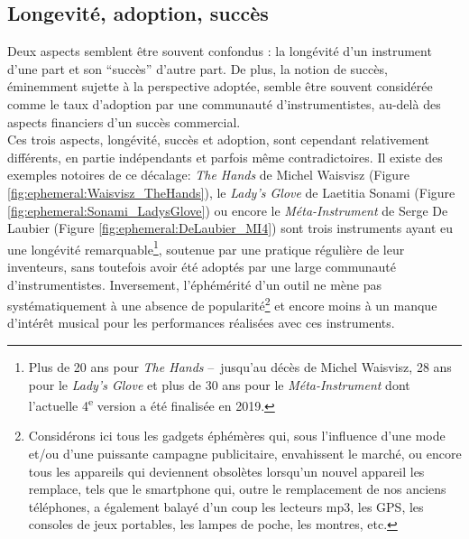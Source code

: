 	
\subsection{Longevité, adoption, succès}

\noindent Deux aspects semblent être souvent confondus : la longévité d'un instrument d'une part et son ``succès'' d'autre part. De plus, la notion de succès, éminemment sujette à la perspective adoptée, semble être souvent considérée comme le taux d'adoption par une communauté d'instrumentistes, au-delà des aspects financiers d'un succès commercial.\\
\indent Ces trois aspects, longévité, succès et adoption, sont cependant relativement différents, en partie indépendants et parfois même contradictoires. Il existe des exemples notoires de ce décalage: \textit{The Hands} de Michel Waisvisz \cite{torre_hands:_2016} (Figure \ref{fig:ephemeral:Waisvisz_TheHands}), le \textit{Lady's Glove} de Laetitia Sonami \cite{sonami_my_2006} (Figure \ref{fig:ephemeral:Sonami_LadysGlove}) ou encore le \textit{Méta-Instrument} de Serge De Laubier \cite{couprie_meta-instrument:_2018} (Figure \ref{fig:ephemeral:DeLaubier_MI4}) sont trois instruments ayant eu une longévité remarquable\footnote{Plus de 20 ans pour \textit{The Hands} --~jusqu'au décès de Michel Waisvisz, 28 ans pour le \textit{Lady's Glove} et plus de 30 ans pour le \textit{Méta-Instrument} dont l'actuelle 4\textsuperscript{e} version a été finalisée en 2019.}, soutenue par une pratique régulière de leur inventeurs, sans toutefois avoir été adoptés par une large communauté d'instrumentistes. Inversement, l'éphémérité d'un outil ne mène pas systématiquement à une absence de popularité\footnote{Considérons ici tous les gadgets éphémères qui, sous l'influence d'une mode et/ou d'une puissante campagne publicitaire, envahissent le marché, ou encore tous les appareils qui deviennent obsolètes lorsqu'un nouvel appareil les remplace, tels que le smartphone qui, outre le remplacement de nos anciens téléphones, a également balayé d'un coup les lecteurs mp3, les GPS, les consoles de jeux portables, les lampes de poche, les montres, etc.} et encore moins à un manque d'intérêt musical pour les performances réalisées avec ces instruments.\\
